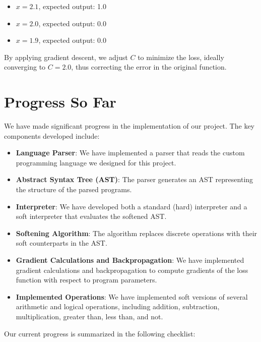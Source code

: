 \documentclass{article}
\begin{document}
\begin{itemize}
    \item $x = 2.1$, expected output: 1.0
    \item $x = 2.0$, expected output: 0.0
    \item $x = 1.9$, expected output: 0.0
\end{itemize}

By applying gradient descent, we adjust $C$ to minimize the loss, ideally converging to $C = 2.0$, thus correcting the error in the original function.

\section{Progress So Far}

We have made significant progress in the implementation of our project. The key components developed include:

\begin{itemize}
    \item \textbf{Language Parser}: We have implemented a parser that reads the custom programming language we designed for this project.

    \item \textbf{Abstract Syntax Tree (AST)}: The parser generates an AST representing the structure of the parsed programs.

    \item \textbf{Interpreter}: We have developed both a standard (hard) interpreter and a soft interpreter that evaluates the softened AST.

    \item \textbf{Softening Algorithm}: The algorithm replaces discrete operations with their soft counterparts in the AST.

    \item \textbf{Gradient Calculations and Backpropagation}: We have implemented gradient calculations and backpropagation to compute gradients of the loss function with respect to program parameters.

    \item \textbf{Implemented Operations}: We have implemented soft versions of several arithmetic and logical operations, including addition, subtraction, multiplication, greater than, less than, and not.
\end{itemize}

Our current progress is summarized in the following checklist:
\end{document}
